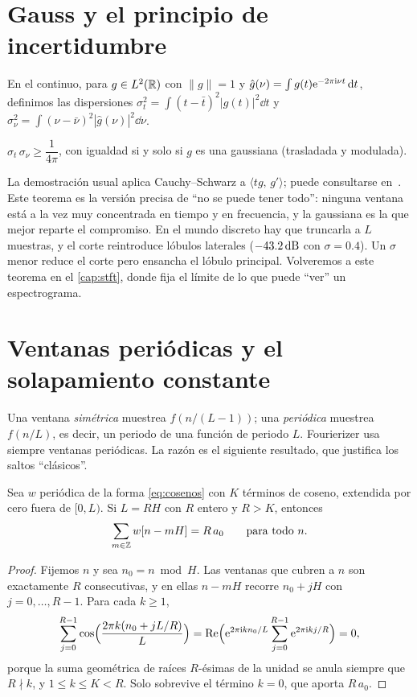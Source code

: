 \section{Gauss y el principio de incertidumbre}

En el continuo, para $g\in L^2(\mathbb{R})$ con $\|g\|=1$ y $\hat g(\nu)=\int g(t)\mathrm{e}^{-2\pi\mathrm{i}\nu t}\,\mathrm{d} t$,
definimos las dispersiones $\sigma_t^2=\int(t-\bar t)^2|g(t)|^2\dd t$ y
$\sigma_\nu^2=\int(\nu-\bar\nu)^2|\hat g(\nu)|^2\dd\nu$.

\begin{teorema}
$\sigma_t\,\sigma_\nu\ge\dfrac{1}{4\pi}$, con igualdad si y solo si $g$ es una gaussiana
(trasladada y modulada).
\end{teorema}

La demostración usual aplica Cauchy–Schwarz a $\langle tg,\,g'\rangle$; puede consultarse
en~\cite{grochenig2001}. Este teorema es la versión precisa de ``no se puede tener todo'':
ninguna ventana está a la vez muy concentrada en tiempo y en frecuencia, y la gaussiana es la que
mejor reparte el compromiso. En el mundo discreto hay que truncarla a $L$ muestras, y el corte
reintroduce lóbulos laterales ($-43.2\,\mathrm{dB}$ con $\sigma=0.4$). Un $\sigma$ menor reduce el corte
pero ensancha el lóbulo principal. Volveremos a este teorema en el \cref{cap:stft}, donde fija el
límite de lo que puede ``ver'' un espectrograma.

\section{Ventanas periódicas y el solapamiento constante}

Una ventana \emph{simétrica} muestrea $f(n/(L-1))$; una \emph{periódica} muestrea $f(n/L)$, es
decir, un periodo de una función de periodo $L$. Fourierizer usa siempre ventanas periódicas.
La razón es el siguiente resultado, que justifica los saltos ``clásicos''.

\begin{proposicion}\label{prop:cola}
Sea $w$ periódica de la forma \eqref{eq:cosenos} con $K$ términos de coseno, extendida por cero
fuera de $[0,L)$. Si $L=RH$ con $R$ entero y $R>K$, entonces
\[
  \sum_{m\in\mathbb{Z}}w[n-mH]=R\,a_0\qquad\text{para todo } n .
\]
\end{proposicion}

\begin{proof}
Fijemos $n$ y sea $n_0=n\bmod H$. Las ventanas que cubren a $n$ son exactamente $R$ consecutivas,
y en ellas $n-mH$ recorre $n_0+jH$ con $j=0,\dots,R-1$. Para cada $k\ge1$,
\[
  \sum_{j=0}^{R-1}\cos\Bigl(\frac{2\pi k(n_0+jL/R)}{L}\Bigr)=\mathrm{Re}\Bigl(\mathrm{e}^{2\pi\mathrm{i} kn_0/L}\sum_{j=0}^{R-1}\mathrm{e}^{2\pi\mathrm{i} kj/R}\Bigr)=0,
\]
porque la suma geométrica de raíces $R$-ésimas de la unidad se anula siempre que $R\nmid k$, y
$1\le k\le K<R$. Solo sobrevive el término $k=0$, que aporta $R\,a_0$.
\end{proof}

